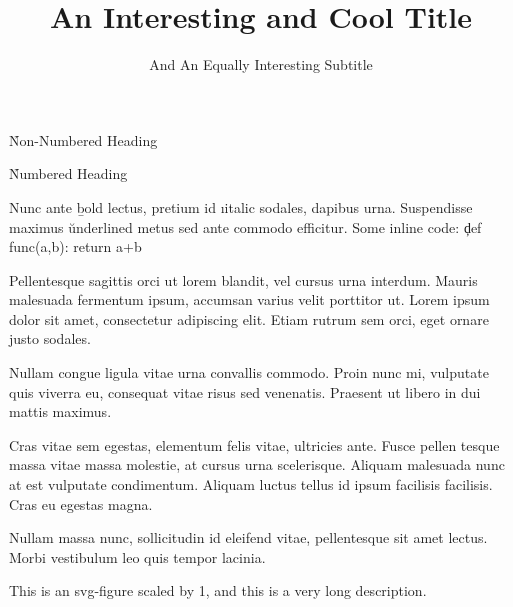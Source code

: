 \documentclass{thesis}
\title    {An Interesting and Cool Title}
\subtitle {And An Equally Interesting Subtitle}
\begin{document}
\toc

\h*{Non-Numbered Heading}
\lipsum[1]

\h{Numbered Heading}
\lipsum[2]

\lipsum[3]

\lipsum[4]

\lipsum[5-10]

Nunc ante \b{bold} lectus, pretium id \i{italic} sodales, dapibus  urna. Suspendisse maximus \u{underlined} metus sed ante commodo efficitur. Some inline code: \c{def func(a,b): return a+b}

Pellentesque sagittis orci ut lorem blandit, vel cursus urna interdum. Mauris malesuada fermentum ipsum, accumsan varius velit porttitor ut. Lorem ipsum dolor sit amet, consectetur adipiscing elit. Etiam rutrum sem orci, eget ornare justo sodales.


Nullam congue ligula vitae urna convallis commodo. Proin nunc mi, vulputate quis viverra eu, consequat vitae risus sed venenatis. Praesent ut libero in dui mattis maximus.


Cras vitae sem egestas, elementum felis vitae, ultricies ante. Fusce pellen tesque massa vitae massa molestie, at cursus urna scelerisque. Aliquam malesuada nunc at est vulputate condimentum. Aliquam luctus tellus id ipsum facilisis facilisis. Cras eu egestas magna.


Nullam massa nunc, sollicitudin id eleifend vitae, pellentesque sit amet lectus. Morbi vestibulum leo quis tempor lacinia.

    {This is an svg-figure scaled by 1, and this is a very long description.}
\end{document}
